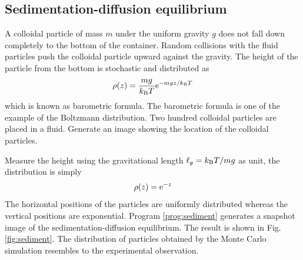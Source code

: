 \noindent
\subsection{Sedimentation-diffusion equilibrium}

A colloidal particle of mass $m$ under the uniform gravity $g$ does not fall down completely to the bottom of the container.  Random collisions with the fluid particles push the colloidal particle upward against the gravity. The height of the particle from the bottom is stochastic and distributed as
\begin{equation}\label{eq:barometric}
\rho(z) = \frac{m g}{k_\text{B} T} \text{e}^{- m g z/k_\text{B} T}
\end{equation}
which is known as barometric formula.\cite{barometric}  The barometric formula is one of the example of the Boltzmann distribution.
Two hundred colloidal particles are placed in a fluid.  Generate an image showing the location of the colloidal particles.

Measure the height using  the gravitational length $\ell_g = k_\text{B} T/m g$ as unit, the distribution is simply
\begin{equation}
\rho(z) = \text{e}^{-z}
\end{equation}
The horizontal positions of the particles are uniformly distributed whereas the vertical positions are exponential.  Program \ref{prog:sediment} generates a snapshot image of the sedimentation-diffusion equilibrium.  The result is shown in Fig. \ref{fig:sediment}.  The distribution of particles obtained by the Monte Carlo simulation resembles to the experimental observation.

